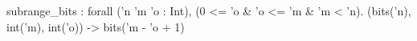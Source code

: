 subrange_bits : forall ('n 'm 'o : Int), (0 <= 'o & 'o <= 'm & 'm < 'n).
  (bits('n), int('m), int('o)) -> bits('m - 'o + 1)